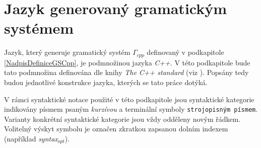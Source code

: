 \section{Jazyk generovaný gramatickým systémem} \label{nadpisJazykGenerovanyGS}
Jazyk, který generuje gramatický systém $\Gamma_{cpp}$ definovaný v podkapitole \ref{NadpisDefiniceGSCpp}, je podmnožinou jazyka \emph{C++}. V této podkapitole bude tato podmnožina
definována dle knihy \emph{The C++ standard} (viz \cite{BSI:2003:CppStandard}). Popsány tedy budou jednotlivé konstrukce jazyka,
kterých se tato práce dotýká.
\begin{notace}
  V rámci syntaktické notace použité v této podkapitole jsou syntaktické kategorie indikovány písmem psaným \emph{kurzívou} a terminální symboly \verb|strojopisným písmem|. Varianty
  konkrétní syntaktické kategorie jsou vždy odděleny novým řádkem. Volitelný výskyt symbolu je označen zkratkou \emph{} zapsanou dolním indexem (například \emph{syntax$_{opt}$}).
\end{notace}

